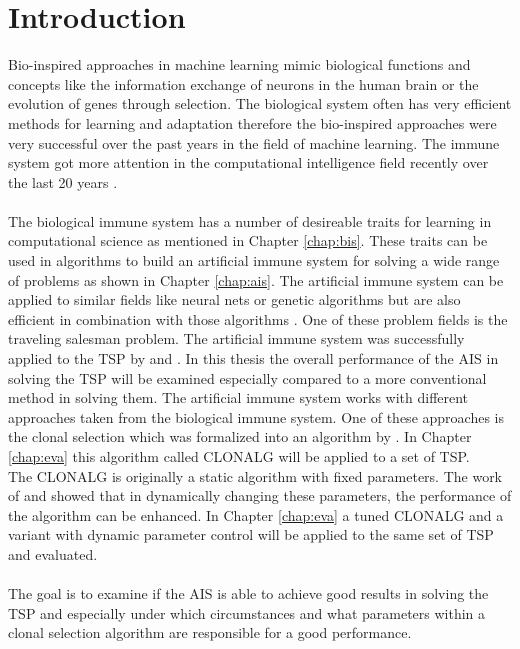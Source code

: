 %
%
% 
% 
% 


\chapter{Introduction}
\label{chap:intro}

Bio-inspired approaches in machine learning mimic biological functions and concepts like the information exchange of neurons in the human brain or the evolution of genes through selection. The biological system often has very efficient methods for learning and adaptation therefore the bio-inspired approaches were very successful over the past years in the field of machine learning. The immune system got more attention in the computational intelligence field recently over the last 20 years \cite{tan2016artificial}.\\\\
The biological immune system has a number of desireable traits for learning in computational science as mentioned in Chapter \ref{chap:bis}. These traits can be used in algorithms to build an artificial immune system for solving a wide range of problems as shown in Chapter \ref{chap:ais}. The artificial immune system can be applied to similar fields like neural nets or genetic algorithms but are also efficient in combination with those algorithms \cite{Pasti06}. One of these problem fields is the traveling salesman problem. The artificial immune system was successfully applied to the TSP by \cite{DEC02} and \cite{sun}. In this thesis the overall performance of the AIS in solving the TSP will be examined especially compared to a more conventional method in solving them. The artificial immune system works with different approaches taken from the biological immune system. One of these approaches is the clonal selection which was formalized into an algorithm by \cite{DEC02}. In Chapter \ref{chap:eva} this algorithm called CLONALG will be applied to a set of TSP.\\
The CLONALG is originally a static algorithm with fixed parameters. The work of \cite{RIFF09} and \cite{Garret04} showed that in dynamically changing these parameters, the performance of the algorithm can be enhanced. In Chapter \ref{chap:eva} a tuned CLONALG and a variant with dynamic parameter control will be applied to the same set of TSP and evaluated.\\\\
The goal is to examine if the AIS is able to achieve good results in solving the TSP and especially under which circumstances and what parameters within a clonal selection algorithm are responsible for a good performance.



